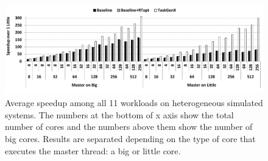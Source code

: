 %	

\begin{figure}[t]%
	\centering
	\includegraphics[width=\columnwidth]{figures/speedup_hetero_avg.pdf}
	\caption{Average speedup among all 11 workloads on heterogeneous simulated systems. The numbers at the bottom of x axis show the total number of cores and the numbers above them show the number of big cores. Results are separated depending on the type of core that executes the master thread: a big or little core.}	
	\label{fig:hetero}
\end{figure}




